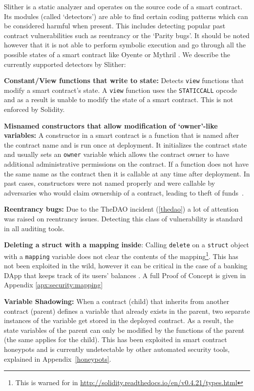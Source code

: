 Slither is a static analyzer and operates on the source code of a smart contract. Its modules (called `detectors') are able to find certain coding patterns which can be considered harmful when present. This includes detecting popular past contract vulnerabilities such as reentrancy or the `Parity bugs'. It should be noted however that it is not able to perform symbolic execution and go through all the possible states of a smart contract like Oyente or Mythril \cite{Luu:2016:MSC:2976749.2978309,mythril}. We describe the currently supported detectors by Slither:

\textbf{Constant/View functions that write to state:} Detects \texttt{view} functions that modify a smart contract's state. A \texttt{view} function uses the \texttt{STATICCALL} opcode and as a result is unable to modify the state of a smart contract\cite{staticcall}. This is not enforced by Solidity.

\textbf{Misnamed constructors that allow modification of `owner'-like variables:} A constructor in a smart contract is a function that is named after the contract name and is run once at deployment. It initializes the contract state and usually sets an \texttt{owner} variable which allows the contract owner to have additional administrative permissions on the contract. If a function does not have the same name as the contract then it is callable at any time after deployment. In past cases, constructors were not named properly and were callable by adversaries who would claim ownership of a contract, leading to theft of funds~\cite{Atzei:2017:SAE:3080353.3080363}.

\textbf{Reentrancy bugs:} Due to the TheDAO incident (\ref{thedao}) a lot of attention was raised on reentrancy issues. Detecting this class of vulnerability is standard in all auditing tools.

\textbf{Deleting a struct with a mapping inside}: Calling \texttt{delete} on a \texttt{struct} object with a \texttt{mapping} variable does not clear the contents of the mapping\footnote{This is warned for in \url{http://solidity.readthedocs.io/en/v0.4.21/types.html}}. This has not been exploited in the wild, however it can be critical in the case of a banking DApp that keeps track of its users' balances . A full Proof of Concept is given in Appendix \ref{apx:security:mapping}

\textbf{Variable Shadowing:} When a contract (child) that inherits from another contract (parent) defines a variable that already exists in the parent, two separate instances of the variable get stored in the deployed contract. As a result, the state variables of the parent can only be modified by the functions of the parent (the same applies for the child). This has been exploited in smart contract honeypots and is currently undetectable by other automated security tools, explained in Appendix~\ref{honeypots}.

